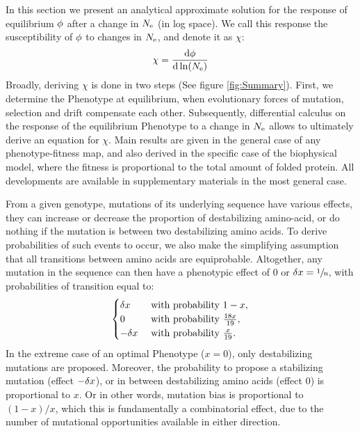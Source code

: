 In this section we present an analytical approximate solution for the response of equilibrium $\phi$ after a change in $N_{\mathrm{e}}$ (in log space).
We call this response the susceptibility of $\phi$ to changes in $N_{\mathrm{e}}$, and denote it as $\chi$:
\begin{align}
    \chi = \frac{ \der \avgpfix}{\der \ln (\Ne)} \label{eq:chi}
\end{align}
Broadly, deriving $\chi$ is done in two steps (See figure \ref{fig:Summary}).
First, we determine the \gls{Phenotype} at equilibrium, when evolutionary forces of mutation, selection and \gls{drift} compensate each other.
Subsequently, differential calculus on the response of the equilibrium \gls{Phenotype} to a change in $N_{\mathrm{e}}$ allows to ultimately derive an equation for $\chi$.
Main results are given in the general case of any phenotype-fitness map, and also derived in the specific case of the biophysical model, where the fitness is proportional to the total amount of folded protein.
All developments are available in supplementary materials in the most general case.

From a given genotype, mutations of its underlying sequence have various effects, they can increase or decrease the proportion of destabilizing amino-acid, or do nothing if the mutation is between two destabilizing amino acids.
To derive probabilities of such events to occur, we also make the simplifying assumption that all {transitions} between amino acids are equiprobable.
Altogether, any mutation in the sequence can then have a phenotypic effect of $0$ or $\delta x=\sfrac{1}{\text{n}}$, with probabilities of {transition} equal to:
\begin{gather}
    \begin{cases}
        \dx &\text{ with probability } 1-x, \\
        0 &\text{ with probability } \frac{18 x }{19}, \\
        -\dx &\text{ with probability } \frac{x}{19}.\\
    \end{cases} \label{eq:proba}
\end{gather}
In the extreme case of an optimal \gls{Phenotype} ($x = 0$), only destabilizing mutations are proposed.
Moreover, the probability to propose a stabilizing mutation (effect $-\delta x$), or in between destabilizing amino acids (effect $0$) is proportional to $x$.
Or in other words, mutation bias is proportional to $(1-x)/x$, which this is fundamentally a combinatorial effect, due to the number of mutational opportunities available in either direction.

